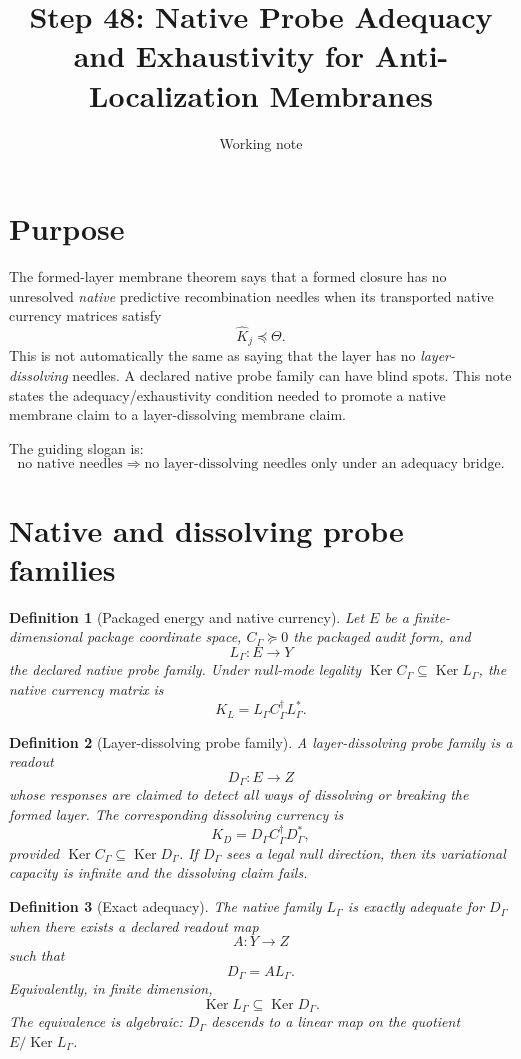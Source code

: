 \documentclass[11pt]{article}
\title{Step 48: Native Probe Adequacy and Exhaustivity for Anti-Localization Membranes}
\author{Working note}
\date{}
\newtheorem{definition}{Definition}
\newcommand{\Ker}{\operatorname{Ker}}
\begin{document}
\maketitle

\section{Purpose}

The formed-layer membrane theorem says that a formed closure has no unresolved
\emph{native} predictive recombination needles when its transported native
currency matrices satisfy
\[
        \widehat K_j \preceq \Theta .
\]
This is not automatically the same as saying that the layer has no
\emph{layer-dissolving} needles.  A declared native probe family can have blind
spots.  This note states the adequacy/exhaustivity condition needed to promote
a native membrane claim to a layer-dissolving membrane claim.

The guiding slogan is:
\[
\boxed{\text{no native needles} \Rightarrow \text{no layer-dissolving needles}
       \text{ only under an adequacy bridge}.}
\]

\section{Native and dissolving probe families}

\begin{definition}[Packaged energy and native currency]
Let \(E\) be a finite-dimensional package coordinate space, \(C_\Gamma\succeq0\)
the packaged audit form, and
\[
        L_\Gamma:E\to Y
\]
the declared native probe family.  Under null-mode legality
\(\Ker C_\Gamma \subseteq \Ker L_\Gamma\), the native currency matrix is
\[
        K_L = L_\Gamma C_\Gamma^\dagger L_\Gamma^* .
\]
\end{definition}

\begin{definition}[Layer-dissolving probe family]
A layer-dissolving probe family is a readout
\[
        D_\Gamma:E\to Z
\]
whose responses are claimed to detect all ways of dissolving or breaking the
formed layer.  The corresponding dissolving currency is
\[
        K_D = D_\Gamma C_\Gamma^\dagger D_\Gamma^* ,
\]
provided \(\Ker C_\Gamma\subseteq \Ker D_\Gamma\).  If \(D_\Gamma\) sees a
legal null direction, then its variational capacity is infinite and the
dissolving claim fails.
\end{definition}

\begin{definition}[Exact adequacy]
The native family \(L_\Gamma\) is exactly adequate for \(D_\Gamma\) when there
exists a declared readout map
\[
        A:Y\to Z
\]
such that
\[
        D_\Gamma = A L_\Gamma .
\]
Equivalently, in finite dimension,
\[
        \Ker L_\Gamma \subseteq \Ker D_\Gamma .
\]
The equivalence is algebraic: \(D_\Gamma\) descends to a linear map on the
quotient \(E/\Ker L_\Gamma\).
\end{definition}
\end{document}
